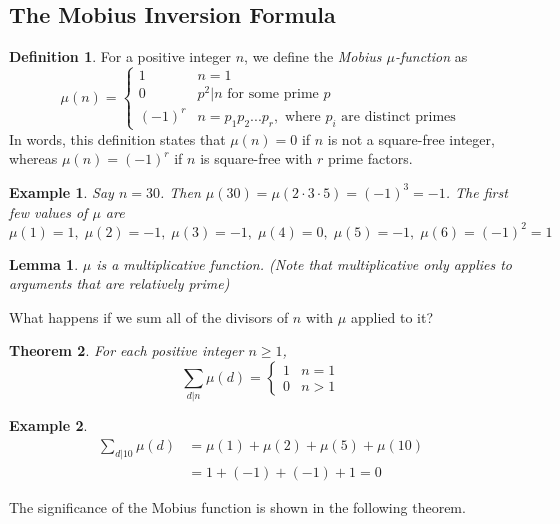 \documentclass{article}
\newtheorem{theorem}{Theorem}[section]
\newtheorem{lemma}[theorem]{Lemma}
\newtheorem{example}{Example}[section]
\theoremstyle{remark}
\theoremstyle{definition}
\newtheorem{definition}{Definition}[section]
\begin{document}
\subsection{The Mobius Inversion Formula}

\begin{definition}
For a positive integer $n$, we define the \textit{Mobius $\mu$-function} as 
\[\mu(n) = \begin{cases}
1 & n = 1 \\
0 & p^2 | n \text{ for some prime } p \\
(-1)^r & n = p_1 p_2 ... p_r, \text{ where } p_i \text{ are distinct primes} 
\end{cases}\]
In words, this definition states that $\mu(n) = 0$ if $n$ is not a square-free integer, whereas $\mu(n) = (-1)^r$ if $n$ is square-free with $r$ prime factors. 
\end{definition}

\begin{example}
Say $n = 30$. Then $\mu(30) = \mu(2 \cdot 3 \cdot 5) = (-1)^3 = -1$. The first few values of $\mu$ are
\[\mu(1) = 1, \; \mu(2) = -1, \; \mu(3) = -1, \; \mu(4) = 0, \; \mu(5) = -1, \; \mu(6) = (-1)^2 = 1\]
\end{example}

\begin{lemma}
$\mu$ is a multiplicative function. (Note that multiplicative only applies to arguments that are relatively prime)
\end{lemma}

What happens if we sum all of the divisors of $n$ with $\mu$ applied to it? 

\begin{theorem}
For each positive integer $n \geq 1$, 
\[\sum_{d|n} \mu(d) = \begin{cases}
1 & n = 1\\
0 & n > 1
\end{cases}\]
\end{theorem}

\begin{example}
\begin{align*}
    \sum_{d|10} \mu(d) & = \mu(1) + \mu(2) + \mu(5) + \mu(10) \\
    & = 1 + (-1) + (-1) + 1 = 0
\end{align*}
\end{example}

The significance of the Mobius function is shown in the following theorem. 
\end{document}
